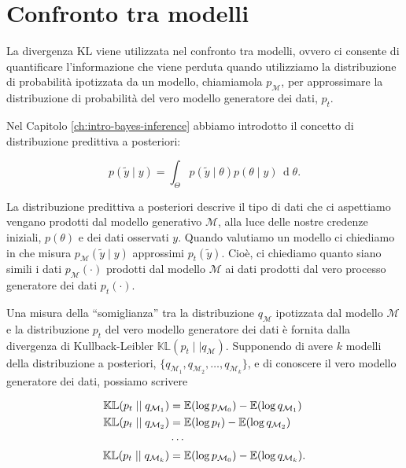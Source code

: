 \documentclass[
  11pt,
]{krantz}
\newcommand{\E}{\mathbb{E}} %
\theoremstyle{definition}
\theoremstyle{definition}
\theoremstyle{definition}
\theoremstyle{definition}
\theoremstyle{remark}
\begin{document}
\hypertarget{confronto-tra-modelli}{%
\section{Confronto tra modelli}\label{confronto-tra-modelli}}

La divergenza KL viene utilizzata nel confronto tra modelli, ovvero ci consente di quantificare l'informazione che viene perduta quando utilizziamo la distribuzione di probabilità ipotizzata da un modello, chiamiamola \(p_{\mathcal{M}}\), per approssimare la distribuzione di probabilità del vero modello generatore dei dati, \(p_t\).

Nel Capitolo \ref{ch:intro-bayes-inference} abbiamo introdotto il concetto di distribuzione predittiva a posteriori:

\[
p(\tilde{y} \mid y) = \int_\Theta p(\tilde{y} \mid \theta) p(\theta \mid y) \,\operatorname {d}\!\theta .
\]

La distribuzione predittiva a posteriori descrive il tipo di dati che ci aspettiamo vengano prodotti dal modello generativo \(\mathcal{M}\), alla luce delle nostre credenze iniziali, \(p(\theta)\) e dei dati osservati \(y\). Quando valutiamo un modello ci chiediamo in che misura \(p_{\mathcal{M}}(\tilde{y} \mid y)\) approssimi \(p_t(\tilde{y})\). Cioè, ci chiediamo quanto siano simili i dati \(p_{\mathcal{M}}(\cdot)\) prodotti dal modello \(\mathcal{M}\) ai dati prodotti dal vero processo generatore dei dati \(p_t(\cdot)\).

Una misura della ``somiglianza'' tra la distribuzione \(q_{\mathcal{M}}\) ipotizzata dal modello \(\mathcal{M}\) e la distribuzione \(p_t\) del vero modello generatore dei dati è fornita dalla divergenza di Kullback-Leibler \(\mathbb{KL}(p_t \mid\mid q_{\mathcal{M}})\). Supponendo di avere \(k\) modelli della distribuzione a posteriori, \(\{q_{\mathcal{M}_1}, q_{\mathcal{M}_2}, \dots, q_{\mathcal{M}_k}\}\), e di conoscere il vero modello generatore dei dati, possiamo scrivere

\begin{align}
\mathbb{KL} (p_t \mid\mid q_{\mathcal{M}_1}) &= \E (\log p_{\mathcal{M}_0}) - \E (\log q_{\mathcal{M}_1})\notag\\
\mathbb{KL} (p_t \mid\mid q_{\mathcal{M}_2}) &= \E (\log p_t) - \E (\log q_{\mathcal{M}_2})\notag\\
&\cdots\notag\\
\mathbb{KL} (p_t \mid\mid q_{\mathcal{M}_k}) &= \E (\log p_{\mathcal{M}_0}) - \E (\log q_{\mathcal{M}_k}).
\label{eq:kl-mod-comp}
\end{align}
\end{document}
